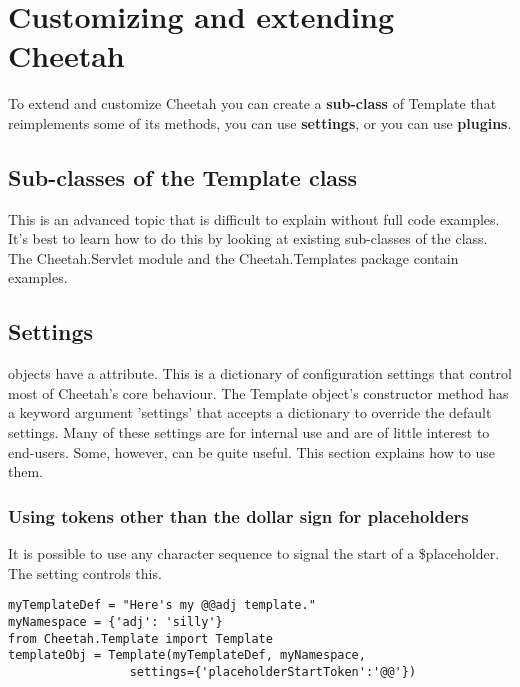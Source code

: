 \section{Customizing and extending Cheetah}
\label{customizing}

To extend and customize Cheetah you can create a {\bf sub-class} of Template that
reimplements some of its methods, you can use {\bf settings}, or you can use
{\bf plugins}.

\subsection{Sub-classes of the Template class}

This is an advanced topic that is difficult to explain without full code
examples.  It's best to learn how to do this by looking at existing sub-classes
of the  class.  The Cheetah.Servlet module and the
Cheetah.Templates package contain examples.


\subsection{Settings}

 objects have a  attribute. This is a dictionary of
configuration settings that control most of Cheetah's core behaviour.  The
Template object's constructor method has a keyword argument 'settings' that
accepts a dictionary to override the default settings.  Many of these settings
are for internal use and are of little interest to end-users.  Some, however,
can be quite useful.  This section explains how to use them.

\subsubsection{Using tokens other than the dollar sign for placeholders}

It is possible to use any character sequence to signal the start of a
\$placeholder.  The  setting controls this.

\begin{verbatim}
myTemplateDef = "Here's my @@adj template."
myNamespace = {'adj': 'silly'}
from Cheetah.Template import Template
templateObj = Template(myTemplateDef, myNamespace, 
                 settings={'placeholderStartToken':'@@'})
\end{verbatim}

